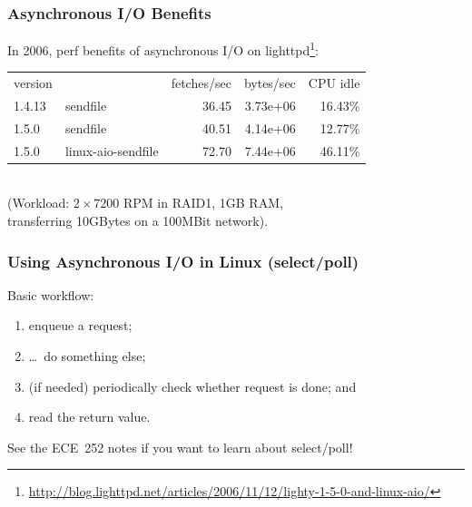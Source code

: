 \begin{frame}
  \frametitle{Asynchronous I/O Benefits}

  
    In 2006, perf benefits of asynchronous I/O on lighttpd\footnote{\tiny \url{http://blog.lighttpd.net/articles/2006/11/12/lighty-1-5-0-and-linux-aio/}}:\\

{\small
    \begin{tabular}{llrrr}
    version & & fetches/sec & bytes/sec & CPU idle \\
    1.4.13 & sendfile & 36.45 & 3.73e+06 & 16.43\% \\
    1.5.0 & sendfile & 40.51 & 4.14e+06 & 12.77\% \\
    1.5.0 & linux-aio-sendfile & 72.70 & 7.44e+06 & 46.11\% \\
    \end{tabular}
}~\\[1em]

    (Workload: $2\times 7200$ RPM in RAID1, 1GB RAM, \\
     \qquad transferring 10GBytes on a 100MBit network).\\[1em]
  
\end{frame}


\begin{frame}
  \frametitle{Using Asynchronous I/O in Linux (select/poll)}


   Basic workflow: \\[1em]
   \begin{enumerate}
     \item enqueue a request;
     \item \ldots ~do something else;
     \item (if needed) periodically check whether request is done; and
     \item read the return value.
   \end{enumerate}

See the ECE~252 notes if you want to learn about select/poll!
  
\end{frame}





